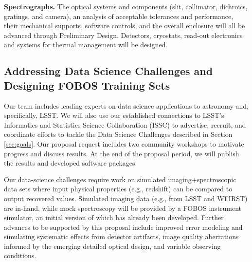 \documentclass[oneside,11pt]{amsart}
\begin{document}
\noindent \textbf{Spectrographs.} The optical systems and components
(slit, collimator, dichroics, gratings, and camera), an analysis of
acceptable tolerances and performance, their mechanical supports,
software controls, and the overall enclosure will all be advanced
through Preliminary Design.  Detectors, cryostats, read-out electronics
and systems for thermal management will be designed.



\subsection{Addressing Data Science Challenges and Designing FOBOS Training Sets}
\label{sec:survey}

Our team includes leading experts on data science applications to
astronomy and, specifically, LSST.  We will also use our established
connections to LSST's Informatics and Statistics Science Collaboration
(ISSC) to advertise, recruit, and coordinate efforts to tackle the Data
Science Challenges described in Section \ref{sec:goals}.  Our proposal
request includes two community workshops to motivate progress and discuss
results. At the end of the proposal period, we will publish the results
and developed software packages.

Our data-science challenges require work on simulated
imaging$+$spectroscopic data sets where input physical properties (e.g.,
redshift) can be compared to output recovered values.  Simulated imaging
data (e.g., from LSST and WFIRST) are in-hand, while mock spectroscopy
will be provided by a FOBOS instrument simulator, an initial version of
which has already been developed.  Further advances to be supported by
this proposal include improved error modeling and simulating systematic
effects from detector artifacts, image quality aberrations informed by
the emerging detailed optical design, and variable observing conditions.
\end{document}
